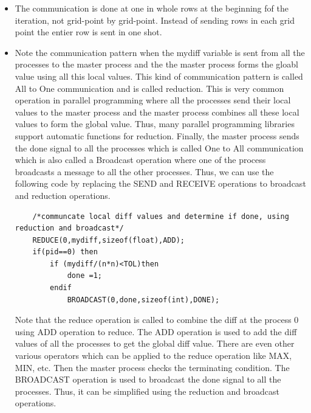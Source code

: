 \documentclass[12pt]{article}
\begin{document}
\begin{itemize}
    \item The communication is done at one in whole rows at the beginning fof the iteration, not grid-point by grid-point. Instead of sending rows in each grid point the entier row is sent in one shot.
    \item Note the communication pattern when the mydiff variable is sent from all the processes to the master process and the the master process forms the gloabl value using all this local values. This kind of communication pattern is called All to One communication and is called reduction.
    This is very common operation in parallel programming where all the processes send their local values to the master process and the master process combines all these local values to form the global value. Thus, many parallel programming libraries support automatic functions for reduction.
    Finally, the master process sends the done signal to all the processes which is called One to All communication which is also called a Broadcast operation where one of the process broadcasts a message to all the other processes.
    Thus, we can use the following code by replacing the SEND and RECEIVE operations to broadcast and reduction operations.
    \begin{lstlisting}
    /*communcate local diff values and determine if done, using reduction and broadcast*/
    REDUCE(0,mydiff,sizeof(float),ADD);
    if(pid==0) then
        if (mydiff/(n*n)<TOL)then
            done =1;
        endif
            BROADCAST(0,done,sizeof(int),DONE);
    \end{lstlisting}
    Note that the reduce operation is called to combine the diff at the process 0 using ADD operation to reduce. The ADD operation is used to add the diff values of all the processes to get the global diff value.
    There are even other various operators which can be applied to the reduce operation like MAX, MIN, etc. Then the master process checks the terminating condition. The BROADCAST operation is used to broadcast the done signal to all the processes.
    Thus, it can be simplified using the reduction and broadcast operations.
\end{itemize}
\end{document}
